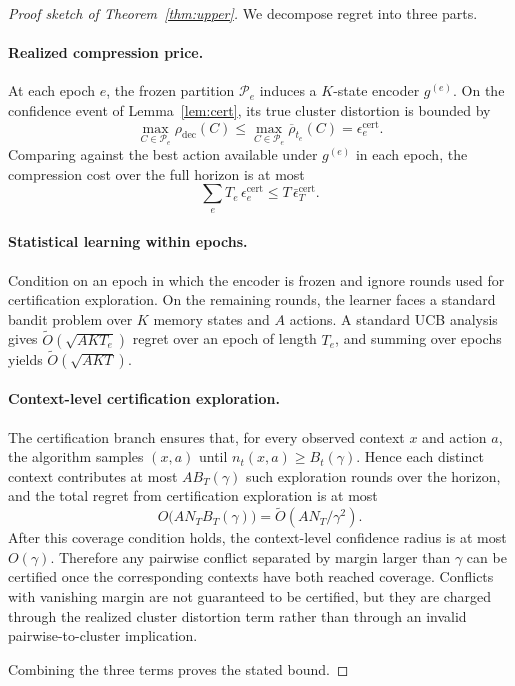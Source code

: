\documentclass{article}
\theoremstyle{plain}
\theoremstyle{definition}
\theoremstyle{remark}
\newcommand{\eps}{\epsilon}
\begin{document}
\begin{proof}[Proof sketch of Theorem~\ref{thm:upper}]
We decompose regret into three parts.

\paragraph{Realized compression price.}
At each epoch \(e\), the frozen partition \(\mathcal P_e\) induces a
\(K\)-state encoder \(g^{(e)}\). On the confidence event of
Lemma~\ref{lem:cert}, its true cluster distortion is bounded by
\[
\max_{C\in\mathcal P_e}\rho_{\mathrm{dec}}(C)
\le
\max_{C\in\mathcal P_e}\overline\rho_{t_e}(C)
=
\eps^{\mathrm{cert}}_e .
\]
Comparing against the best action available under \(g^{(e)}\) in each
epoch, the compression cost over the full horizon is at most
\[
\sum_e T_e\,\eps^{\mathrm{cert}}_e
\le
T\,\bar\eps^{\mathrm{cert}}_T .
\]

\paragraph{Statistical learning within epochs.}
Condition on an epoch in which the encoder is frozen and ignore rounds used
for certification exploration. On the remaining rounds, the learner faces a
standard bandit problem over \(K\) memory states and \(A\) actions. A
standard UCB analysis gives \(\tilde O(\sqrt{AKT_e})\) regret over an epoch
of length \(T_e\), and summing over epochs yields
\(\tilde O(\sqrt{AKT})\).

\paragraph{Context-level certification exploration.}
The certification branch ensures that, for every observed context \(x\) and
action \(a\), the algorithm samples \((x,a)\) until
\(n_t(x,a)\ge B_t(\gamma)\). Hence each distinct context contributes at most
\(A B_T(\gamma)\) such exploration rounds over the horizon, and the total
regret from certification exploration is at most
\[
O\!\bigl(A N_T B_T(\gamma)\bigr)
=
\tilde O(A N_T/\gamma^2).
\]
After this coverage condition holds, the context-level confidence radius is
at most \(O(\gamma)\). Therefore any pairwise conflict separated by margin
larger than \(\gamma\) can be certified once the corresponding contexts have
both reached coverage. Conflicts with vanishing margin are not guaranteed to
be certified, but they are charged through the realized cluster distortion
term rather than through an invalid pairwise-to-cluster implication.

Combining the three terms proves the stated bound.
\end{proof}
\end{document}
